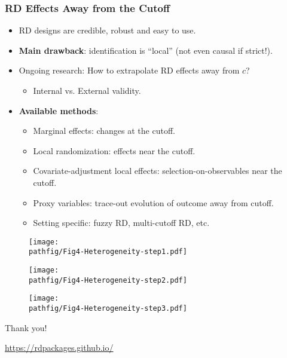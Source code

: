 \documentclass[9pt]{beamer}
\renewcommand{\c}{c}
\newcommand{\pathfig}{figures}
\begin{document}
\begin{frame}\frametitle{RD Effects Away from the Cutoff}
	\begin{itemize}
		\item RD designs are credible, robust and easy to use.\medskip
		
		\item \textbf{Main drawback}: identification is ``local'' (not even causal if strict!).\medskip
		
		\item Ongoing research: How to extrapolate RD effects away from $\c$?\medskip		
		\begin{itemize}
			\item Internal vs. External validity.\bigskip
		\end{itemize}
		
		\item \textbf{Available methods}:\medskip
		\begin{itemize}
			\item Marginal effects: changes at the cutoff.\medskip
			\item Local randomization: effects near the cutoff.\medskip
			\item Covariate-adjustment local effects: selection-on-observables near the cutoff.\medskip
			\item Proxy variables: trace-out evolution of outcome away from cutoff.\medskip
			\item Setting specific: fuzzy RD, multi-cutoff RD, etc.
		\end{itemize}
	\end{itemize}
\end{frame}

\begin{frame}
	\begin{figure}[h]
		\centering\texttt{[image: \\pathfig/Fig4-Heterogeneity-step1.pdf]}
	\end{figure}
\end{frame}

\begin{frame}
	\begin{figure}[h]
		\centering\texttt{[image: \\pathfig/Fig4-Heterogeneity-step2.pdf]}
	\end{figure}
\end{frame}

\begin{frame}
	\begin{figure}[h]
		\centering\texttt{[image: \\pathfig/Fig4-Heterogeneity-step3.pdf]}
	\end{figure}
\end{frame}

\begin{frame}

\begin{center}
	\LARGE Thank you!
\end{center}

\vspace{.5in}

\begin{center}
	\url{https://rdpackages.github.io/}\medskip
\end{center}

\end{frame}
\end{document}
